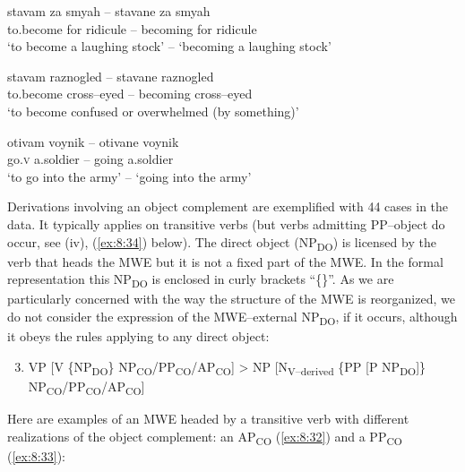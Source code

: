 \documentclass[output=paper]{langsci/langscibook}
\begin{document}
\begin{exe}
\ex \label{ex:8:29}
\settowidth{}
\gll stavam za smyah – stavane za smyah \\
{to.become} for ridicule – becoming for ridicule\\ 
\glt ‘to become a laughing stock’ – ‘becoming a laughing stock’
\end{exe}

\begin{exe}
\ex \label{ex:8:30}
\settowidth{}
\gll stavam raznogled – stavane raznogled\\ 
{to.become} cross–eyed – becoming cross–eyed \\ 
\glt ‘to become confused or overwhelmed (by something)’
\end{exe}

\begin{exe}
\ex \label{ex:8:31}
\settowidth{}
\gll otivam voynik – otivane voynik\\
go.\textsc{v} {a.soldier} – going {a.soldier}\\  
\glt ‘to go into the army’ – ‘going into the army’
\end{exe}


Derivations involving an object complement are exemplified with 44 cases
in the data. It typically applies on transitive verbs (but verbs
admitting PP–object do occur, see (iv), (\ref{ex:8:34}) below). The direct object
(NP\textsubscript{DO}) is licensed by the verb that heads the MWE but
it is not a fixed part of the MWE. In the formal representation this
NP\textsubscript{DO} is enclosed in curly brackets “\{\}”. As we are
particularly concerned with the way the structure of the MWE is
reorganized, we do not consider the expression of the MWE–external
NP\textsubscript{DO}, if it occurs, although it obeys the rules
applying to any direct object:


\renewcommand{\theenumi}{(\roman{enumi})}%
\begin{enumerate}
 \setcounter{enumi}{2}
 \item VP [V \{NP\textsubscript{DO}\}
NP\textsubscript{CO}/PP\textsubscript{CO}/AP\textsubscript{CO}] > NP
[N\textsubscript{V–derived} \{PP [P NP\textsubscript{DO}]\}
NP\textsubscript{CO}/\linebreak PP\textsubscript{CO}/AP\textsubscript{CO}]
\end{enumerate}

Here are examples of an MWE headed by a transitive verb with different
realizations of the object complement: an AP\textsubscript{CO} (\ref{ex:8:32}) and
a PP\textsubscript{CO} (\ref{ex:8:33}):
\end{document}
